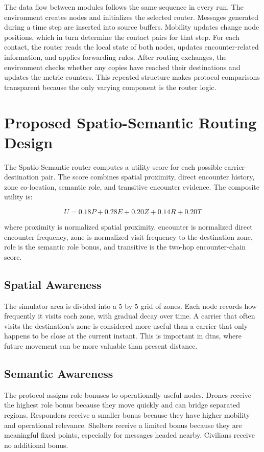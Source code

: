 The data flow between modules follows the same sequence in every run. The environment creates nodes and initializes the selected router. Messages generated during a time step are inserted into source buffers. Mobility updates change node positions, which in turn determine the contact pairs for that step. For each contact, the router reads the local state of both nodes, updates encounter-related information, and applies forwarding rules. After routing exchanges, the environment checks whether any copies have reached their destinations and updates the metric counters. This repeated structure makes protocol comparisons transparent because the only varying component is the router logic.

\section{Proposed Spatio-Semantic Routing Design}
The Spatio-Semantic router computes a utility score for each possible carrier-destination pair. The score combines spatial proximity, direct encounter history, zone co-location, semantic role, and transitive encounter evidence. The composite utility is:

\begin{equation}
	U = 0.18P + 0.28E + 0.20Z + 0.14R + 0.20T
\end{equation}

where \ac{proximity} is normalized spatial proximity, \ac{encounter} is normalized direct encounter frequency, \ac{zone} is normalized visit frequency to the destination zone, \ac{role} is the semantic role bonus, and \ac{transitive} is the two-hop encounter-chain score.

\subsection{Spatial Awareness}
The simulator area is divided into a 5 by 5 grid of zones. Each node records how frequently it visits each zone, with gradual decay over time. A carrier that often visits the destination's zone is considered more useful than a carrier that only happens to be close at the current instant. This is important in \acp{dtn}, where future movement can be more valuable than present distance.

\subsection{Semantic Awareness}
The protocol assigns role bonuses to operationally useful nodes. Drones receive the highest role bonus because they move quickly and can bridge separated regions. Responders receive a smaller bonus because they have higher mobility and operational relevance. Shelters receive a limited bonus because they are meaningful fixed points, especially for messages headed nearby. Civilians receive no additional bonus.

